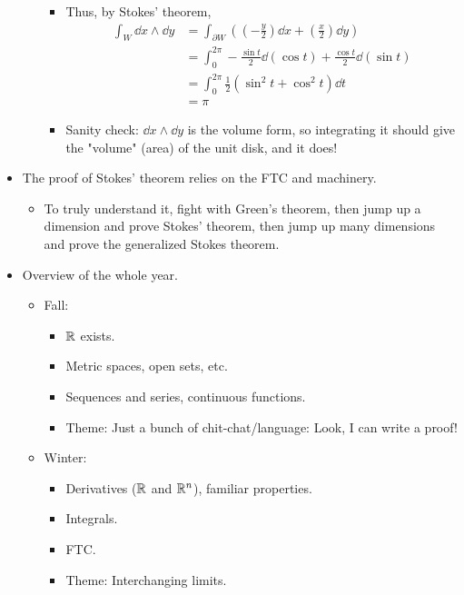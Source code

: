 \documentclass[../notes.tex]{subfiles}
\begin{document}
\begin{itemize}
\begin{itemize}
\begin{itemize}
            \item Thus, by Stokes' theorem,
            \begin{align*}
                \int_W\dd{x}\wedge\dd{y} &= \int_{\partial W}\left( \left( -\frac{y}{2} \right)\dd{x}+\left( \frac{x}{2} \right)\dd{y} \right)\\
                &= \int_0^{2\pi}-\frac{\sin t}{2}\dd(\cos t)+\frac{\cos t}{2}\dd(\sin t)\\
                &= \int_0^{2\pi}\frac{1}{2}(\sin^2t+\cos^2t)\dd{t}\\
                &= \pi
            \end{align*}
            \item Sanity check: $\dd{x}\wedge\dd{y}$ is the volume form, so integrating it should give the "volume" (area) of the unit disk, and it does!
        \end{itemize}
    \end{itemize}
    \item The proof of Stokes' theorem relies on the FTC and machinery.
    \begin{itemize}
        \item To truly understand it, fight with Green's theorem, then jump up a dimension and prove Stokes' theorem, then jump up many dimensions and prove the generalized Stokes theorem.
    \end{itemize}
    \item Overview of the whole year.
    \begin{itemize}
        \item Fall:
        \begin{itemize}
            \item $\mathbb{R}$ exists.
            \item Metric spaces, open sets, etc.
            \item Sequences and series, continuous functions.
            \item Theme: Just a bunch of chit-chat/language: Look, I can write a proof!
        \end{itemize}
        \item Winter:
        \begin{itemize}
            \item Derivatives ($\mathbb{R}$ and $\mathbb{R}^n$), familiar properties.
            \item Integrals.
            \item FTC.
            \item Theme: Interchanging limits.

\end{itemize}
\end{itemize}
\end{itemize}
\end{document}
